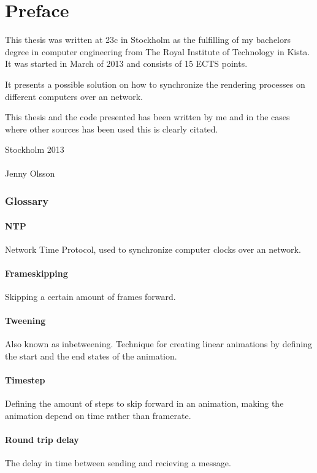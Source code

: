 \chapter{Preface}

This thesis was written at 23c in Stockholm as the fulfilling of my bachelors degree in computer engineering from The Royal Institute of Technology in Kista. It was started in March of 2013 and consists of 15 ECTS points. 

It presents a possible solution on how to synchronize the rendering processes on different computers over an network. 

This thesis and the code presented has been written by me and in the cases where other sources has been used this is clearly citated. 


\vspace{20mm}
\mbox{}\hfill
\begin{minipage}[t]{80mm}
  Stockholm 2013\\
  \vspace{1cm}\\
  Jenny Olsson
\end{minipage}

\subsection*{Glossary}

\subsubsection*{NTP}
Network Time Protocol, used to synchronize computer clocks over an network. 

\subsubsection*{Frameskipping}
Skipping a certain amount of frames forward.

\subsubsection*{Tweening}
Also known as inbetweening. Technique for creating linear animations by defining the start and the end states of the animation. 

\subsubsection*{Timestep}
Defining the amount of steps to skip forward in an animation, making the animation depend on time rather than framerate.

\subsubsection*{Round trip delay}
The delay in time between sending and recieving a message. 

